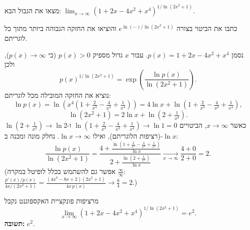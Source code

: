 
\begin{question}
מצאו את הגבול הבא:
$\displaystyle \lim_{x\to\infty}\left(1+2x-4x^2+x^4\right)^{1/\ln(2x^2+1)}$.
\end{question}

\begin{hint}
כתבו את הביטוי בצורה $e^{\ln(\cdots)/\ln(2x^2+1)}$ והוציאו את החזקה הגבוהה ביותר מתוך כל לוגריתם.
\end{hint}

\begin{solution}
נסמן $p(x)=1+2x-4x^2+x^4$. עבור $x$ גדול מספיק $p(x)>0$ (כי $p(x)\to\infty$), ולכן
\[ p(x)^{1/\ln(2x^2+1)} = \exp\left(\frac{\ln p(x)}{\ln(2x^2+1)}\right). \]
נוציא את החזקה המובילה מכל לוגריתם:
\[ \ln p(x) = \ln\left(x^4\left(1+\tfrac{2}{x^3}-\tfrac{4}{x^2}+\tfrac{1}{x^4}\right)\right) = 4\ln x + \ln\left(1+\tfrac{2}{x^3}-\tfrac{4}{x^2}+\tfrac{1}{x^4}\right), \]
\[ \ln(2x^2+1) = 2\ln x + \ln\left(2+\tfrac{1}{x^2}\right). \]
כאשר $x\to\infty$, הביטויים $\ln\left(1+\tfrac{2}{x^3}-\tfrac{4}{x^2}+\tfrac{1}{x^4}\right)\to \ln 1 = 0$ ו-$\ln\left(2+\tfrac1{x^2}\right)\to\ln 2$ (רציפות הלוגריתם), ואילו $\ln x\to\infty$. נחלק מונה ומכנה ב-$\ln x$:
\[ \frac{\ln p(x)}{\ln(2x^2+1)} = \frac{4 + \frac{\ln\left(1+\frac{2}{x^3}-\frac{4}{x^2}+\frac{1}{x^4}\right)}{\ln x}}{2+\frac{\ln\left(2+\frac{1}{x^2}\right)}{\ln x}} \xrightarrow[x\to\infty]{} \frac{4+0}{2+0}=2. \]
(אפשר גם להשתמש בכלל לופיטל במקרה $\frac{\infty}{\infty}$: $\frac{p'(x)/p(x)}{4x/(2x^2+1)}=\frac{(4x^3-8x+2)(2x^2+1)}{4x\,p(x)}\to\frac{8}{4}=2$.)

מרציפות פונקציית האקספוננט נקבל
\[ \lim_{x\to\infty}\left(1+2x-4x^2+x^4\right)^{1/\ln(2x^2+1)} = e^{2}. \]
\textbf{תשובה:} $e^2$.
\end{solution}
